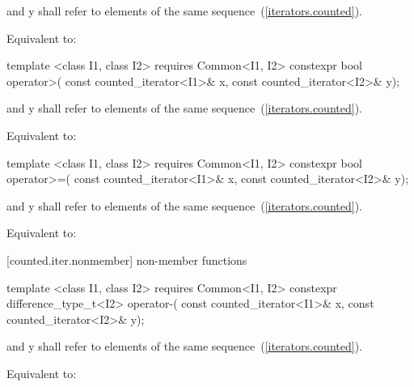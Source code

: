 \begin{itemdescr}
\pnum
\requires {} and {y} shall refer to
elements of the same sequence~(\ref{iterators.counted}).

\pnum
\effects Equivalent to:
\end{itemdescr}

%
%
\begin{itemdecl}
template <class I1, class I2>
    requires Common<I1, I2>
  constexpr bool operator>(
    const counted_iterator<I1>& x, const counted_iterator<I2>& y);
\end{itemdecl}

\begin{itemdescr}
\pnum
\requires {} and {y} shall refer to
elements of the same sequence~(\ref{iterators.counted}).

\pnum
\effects Equivalent to:
\end{itemdescr}

%
%
\begin{itemdecl}
template <class I1, class I2>
    requires Common<I1, I2>
  constexpr bool operator>=(
    const counted_iterator<I1>& x, const counted_iterator<I2>& y);
\end{itemdecl}

\begin{itemdescr}
\pnum
\requires {} and {y} shall refer to
elements of the same sequence~(\ref{iterators.counted}).

\pnum
\effects Equivalent to:
\end{itemdescr}

[counted.iter.nonmember]{ non-member functions}

%
%
\begin{itemdecl}
  template <class I1, class I2>
      requires Common<I1, I2>
  constexpr difference_type_t<I2> operator-(
    const counted_iterator<I1>& x, const counted_iterator<I2>& y);
\end{itemdecl}

\begin{itemdescr}
\pnum
\requires {} and {y} shall refer to
elements of the same sequence~(\ref{iterators.counted}).

\pnum
\effects Equivalent to:
\end{itemdescr}

